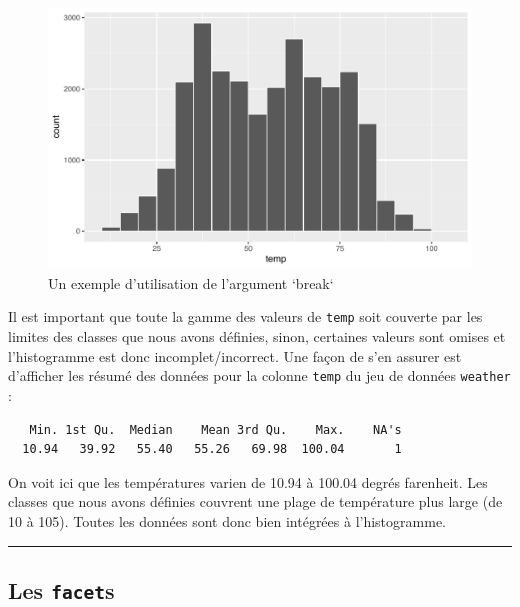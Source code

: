 \documentclass[a4paperpaper,]{article}
\newenvironment{Shaded}{\begin{snugshade}}{\end{snugshade}}
\newcommand{\KeywordTok}[1]{\textcolor[rgb]{0.12,0.11,0.11}{\textbf{#1}}}
\newcommand{\NormalTok}[1]{\textcolor[rgb]{0.12,0.11,0.11}{#1}}
\newcommand{\OperatorTok}[1]{\textcolor[rgb]{0.12,0.11,0.11}{#1}}
\theoremstyle{definition}
\theoremstyle{definition}
\theoremstyle{definition}
\theoremstyle{remark}
\begin{document}
\begin{figure}[htpb]

{\centering \includegraphics[width=0.9\linewidth]{figure/break-1} 

}

\caption{Un exemple d'utilisation de l'argument `break`}\label{fig:break}
\end{figure}

Il est important que toute la gamme des valeurs de \texttt{temp} soit
couverte par les limites des classes que nous avons définies, sinon,
certaines valeurs sont omises et l'histogramme est donc
incomplet/incorrect. Une façon de s'en assurer est d'afficher les résumé
des données pour la colonne \texttt{temp} du jeu de données
\texttt{weather} :

\begin{Shaded}
\end{Shaded}

\begin{verbatim}
   Min. 1st Qu.  Median    Mean 3rd Qu.    Max.    NA's 
  10.94   39.92   55.40   55.26   69.98  100.04       1 
\end{verbatim}

On voit ici que les températures varien de 10.94 à 100.04 degrés
farenheit. Les classes que nous avons définies couvrent une plage de
température plus large (de 10 à 105). Toutes les données sont donc bien
intégrées à l'histogramme.

\begin{center}\rule{0.5\linewidth}{\linethickness}\end{center}

\hypertarget{facets}{%
\subsection{\texorpdfstring{Les
\texttt{facet}s}{Les facets}}\label{facets}}
\end{document}
